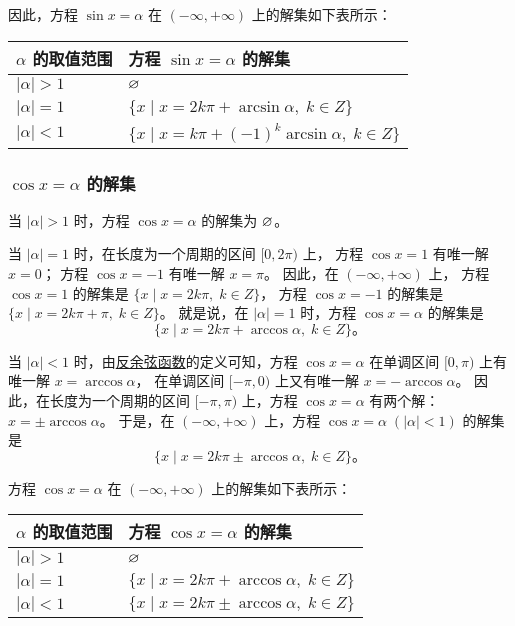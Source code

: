 因此，方程 $\sin x = \alpha$ 在 $(-\infty, +\infty)$ 上的解集如下表所示：

\begin{table}[H]
    \centering
    \renewcommand\arraystretch{1.5}
    \begin{tabular}{|w{c}{10em}|w{c}{20em}|}
        \hline
        $\alpha$ 的取值范围 & 方程 $\sin x = \alpha$ 的解集 \\ \hline
        $|\alpha| > 1$ & $\varnothing$ \\ \hline
        $|\alpha| = 1$ & $\{ x \mid x = 2k\pi + \arcsin\alpha, \; k \in Z \}$ \\ \hline
        $|\alpha| < 1$ & $\{ x \mid x = k\pi + (-1)^k \arcsin\alpha, \; k \in Z \}$ \\ \hline
    \end{tabular}
\end{table}

\subsubsection{$\cos x = \alpha$ 的解集}

当 $|\alpha| > 1$ 时，方程 $\cos x = \alpha$ 的解集为 $\varnothing$。

当 $|\alpha| = 1$ 时，在长度为一个周期的区间 $[0, 2\pi)$ 上，
方程 $\cos x = 1$ 有唯一解 $x = 0$；
方程 $\cos x = -1$ 有唯一解 $x = \pi$。
因此，在 $(-\infty, +\infty)$ 上，
方程 $\cos x = 1$ 的解集是 $\{ x \mid x = 2k\pi, \; k \in Z \}$，
方程 $\cos x = -1$ 的解集是 $\{ x \mid x = 2k\pi + \pi, \; k \in Z \}$。
就是说，在 $|\alpha| = 1$ 时，方程 $\cos x = \alpha$ 的解集是
$$ \{ x \mid x = 2k\pi + \arccos \alpha, \; k \in Z \} \text{。} $$

当 $|\alpha| < 1$ 时，由\hyperref[subsec:1-2]{反余弦函数}的定义可知，方程 $\cos x = \alpha$
在单调区间 $[0, \pi)$ 上有唯一解 $x = \arccos\alpha$，
在单调区间 $[-\pi, 0)$ 上又有唯一解 $x = -\arccos\alpha$。
因此，在长度为一个周期的区间 $[-\pi, \pi)$ 上，方程 $\cos x = \alpha$ 有两个解：$x = \pm \arccos\alpha$。
于是，在 $(-\infty, +\infty)$ 上，方程 $\cos x = \alpha \; (|\alpha| < 1)$ 的解集是
$$\{x \mid x = 2k\pi \pm \arccos\alpha, \; k \in Z\} \text{。}$$

方程 $\cos x = \alpha$ 在 $(-\infty, +\infty)$ 上的解集如下表所示：

\begin{table}[H]
    \centering
    \renewcommand\arraystretch{1.5}
    \begin{tabular}{|w{c}{10em}|w{c}{20em}|}
        \hline
        $\alpha$ 的取值范围 & 方程 $\cos x = \alpha$ 的解集 \\ \hline
        $|\alpha| > 1$ & $\varnothing$ \\ \hline
        $|\alpha| = 1$ & $\{ x \mid x = 2k\pi + \arccos\alpha, \; k \in Z \}$ \\ \hline
        $|\alpha| < 1$ & $\{ x \mid x = 2k\pi \pm \arccos\alpha, \; k \in Z \}$ \\ \hline
    \end{tabular}
\end{table}


